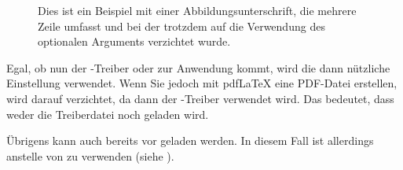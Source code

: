 \begin{Example}
\begin{lstcode}[moretexcs={hypersetup}]
  \listoffigures
  \clearpage
  \begin{figure}
    \caption{Dies ist ein Beispiel mit einer
      Abbildungsunterschrift, die mehrere Zeile
      umfasst und bei der trotzdem auf die
      Verwendung des optionalen Arguments verzichtet
      wurde.}
  \end{figure}
  
\end{lstcode}
  Egal, ob nun der -Treiber  oder
   zur Anwendung kommt, wird die dann nützliche Einstellung
   verwendet. Wenn Sie jedoch mit \mbox{pdf\LaTeX} eine
  PDF-Datei erstellen, wird darauf verzichtet, da dann der
  -Treiber  verwendet wird. Das bedeutet,
  dass weder die Treiberdatei  noch 
  geladen wird.
\end{Example}
%
Übrigens kann  auch bereits vor
 geladen werden. In
diesem Fall ist allerdings 
anstelle von  zu verwenden (siehe
\cite{latex:clsguide}).%
\EndIndexGroup


